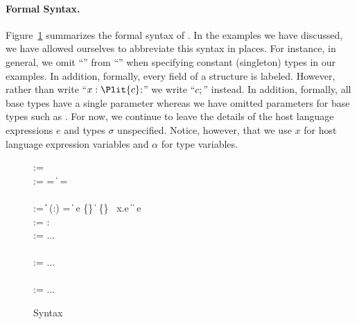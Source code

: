 \paragraph*{Formal Syntax.}
Figure~\ref{fig:ipads-syntax} summarizes the formal syntax of 
\ipads.  In the examples we have discussed, we have allowed ourselves
to abbreviate this syntax in places.  For instance, in general, we
omit ``'' from ``'' 
when specifying constant (singleton) types
in our examples.  In addition, formally, every field of a structure is
labeled.  However, rather than write 
``$x : \Plit{c};$'' we write ``$c;$'' instead.  In addition, formally, all base
types \Pbase{} have a single parameter whereas we have omitted parameters for
base types such as \Puint.  For now, we continue to leave the details
of the host language expressions $e$ and types $\sigma$ unspecified.  Notice, however, that we use $x$ for
host language expression variables and $\alpha$ for \ipads{} type 
variables.


\begin{figure}
\begin{bnf}
    \::=  \; \\
    \::= \alpha = 
  \|  \Prec{} \; \alpha =  \\ \\
    \::= 
     \| \alpha \| \Plit{\const} \nlalt
    \Pfun{} (\var:\ity) =  \| \; e \nlalt
    \Pstruct{} \{\} \| 
    \Punion{} \{\} \nlalt
     \; \Pwhere{} \, x.e \| 
    \Popt{}\;  \nlalt 
     \| 
    \Pcompute{} \; e 
    \\
     \::= \var : 
    \\
     \::= ... \\ \\
     \::= ... \\ \\
   \meta{\sigma}  \::= ...
\end{bnf}
\caption{\ipads{} Syntax}
\label{fig:ipads-syntax}
\end{figure}



